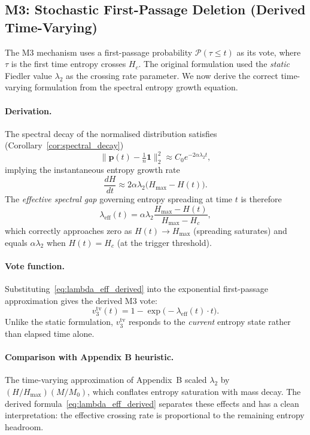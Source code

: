 
\subsection{M3: Stochastic First-Passage Deletion (Derived Time-Varying)}
\label{sec:m3_derived}

The M3 mechanism uses a first-passage probability $\mathcal{P}(\tau \leq t)$
as its vote, where $\tau$ is the first time entropy crosses $H_c$.
The original formulation used the \emph{static} Fiedler value $\lambda_2$
as the crossing rate parameter. We now derive the correct time-varying
formulation from the spectral entropy growth equation.

\paragraph{Derivation.}
The spectral decay of the normalised distribution satisfies
(Corollary~\ref{cor:spectral_decay})
\begin{equation}
  \|\mathbf{p}(t) - \tfrac{1}{n}\mathbf{1}\|_2^2 \approx
  C_0 e^{-2\alpha\lambda_2 t},
\end{equation}
implying the instantaneous entropy growth rate
\begin{equation}
  \frac{dH}{dt} \approx 2\alpha\lambda_2\bigl(H_{\max} - H(t)\bigr).
\end{equation}
The \emph{effective spectral gap} governing entropy spreading at time $t$ is
therefore
\begin{equation}
  \label{eq:lambda_eff_derived}
  \lambda_{\mathrm{eff}}(t) = \alpha\lambda_2
    \frac{H_{\max} - H(t)}{H_{\max} - H_c},
\end{equation}
which correctly approaches zero as $H(t) \to H_{\max}$ (spreading saturates)
and equals $\alpha\lambda_2$ when $H(t) = H_c$ (at the trigger threshold).

\paragraph{Vote function.}
Substituting~\eqref{eq:lambda_eff_derived} into the exponential first-passage
approximation gives the derived M3 vote:
\begin{equation}
  v_3^{\mathrm{tv}}(t) = 1 - \exp\!\bigl(-\lambda_{\mathrm{eff}}(t)\cdot t\bigr).
\end{equation}
Unlike the static formulation, $v_3^{\mathrm{tv}}$ responds to the
\emph{current} entropy state rather than elapsed time alone.

\paragraph{Comparison with Appendix B heuristic.}
The time-varying approximation of Appendix~B scaled $\lambda_2$ by
$(H/H_{\max})(M/M_0)$, which conflates entropy saturation with mass decay.
The derived formula~\eqref{eq:lambda_eff_derived} separates these effects
and has a clean interpretation: the effective crossing rate is proportional
to the remaining entropy headroom.
